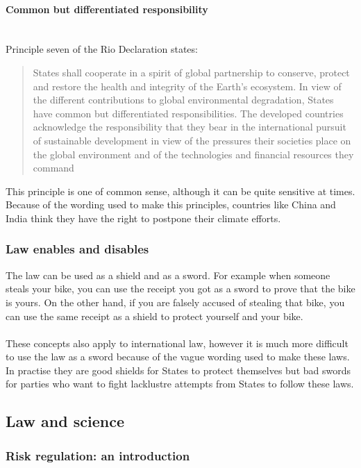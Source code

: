 \documentclass[../summary.tex]{subfiles}
\begin{document}
			\paragraph{Common but differentiated responsibility}\mbox{}\\
				\label{par:13-comm-diff-res}
				Principle seven of the Rio Declaration states:
				\begin{quote}
					States shall cooperate in a spirit of global partnership to conserve, protect and restore the health and integrity of the Earth's ecosystem. In view of the different contributions to global environmental degradation, States have common but differentiated responsibilities. The developed countries acknowledge the responsibility that they bear in the international pursuit of sustainable development in view of the pressures their societies place on the global environment and of the technologies and financial resources they command
				\end{quote}
				This principle is one of common sense, although it can be quite sensitive at times. Because of the wording used to make this principles, countries like China and India think they have the right to postpone their climate efforts. 
				
			\subsubsection{Law enables and disables}
				The law can be used as a shield and as a sword. For example when someone steals your bike, you can use the receipt you got as a sword to prove that the bike is yours. On the other hand, if you are falsely accused of stealing that bike, you can use the same receipt as a shield to protect yourself and your bike. \\
				\\
				These concepts also apply to international law, however it is much more difficult to use the law as a sword because of the vague wording used to make these laws. In practise they are good shields for States to protect themselves but bad swords for parties who want to fight lacklustre attempts from States to follow these laws. 
				
	\subsection{Law and science}
		\subsubsection{Risk regulation: an introduction}
\end{document}
